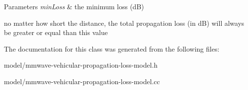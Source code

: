 \begin{DoxyParams}{Parameters}
{\em min\+Loss} & the minimum loss (dB)\\
\hline
\end{DoxyParams}
no matter how short the distance, the total propagation loss (in dB) will always be greater or equal than this value 

The documentation for this class was generated from the following files\+:\begin{DoxyCompactItemize}
\item 
model/mmwave-\/vehicular-\/propagation-\/loss-\/model.\+h\item 
model/mmwave-\/vehicular-\/propagation-\/loss-\/model.\+cc\end{DoxyCompactItemize}
